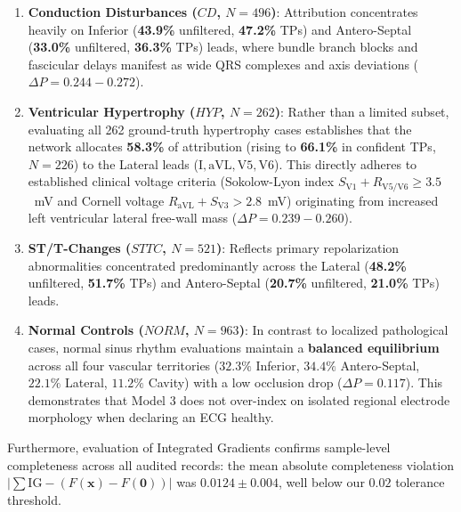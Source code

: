 \documentclass[5p,twocolumn,10pt]{elsarticle}
\begin{document}
\begin{enumerate}
    This confirms per-patient anatomical attribution concordance against verified clinical sub-diagnoses.
    \item \textbf{Conduction Disturbances ($CD$, $N=496$)}: Attribution concentrates heavily on Inferior (\textbf{43.9\%} unfiltered, \textbf{47.2\%} TPs) and Antero-Septal (\textbf{33.0\%} unfiltered, \textbf{36.3\%} TPs) leads, where bundle branch blocks and fascicular delays manifest as wide QRS complexes and axis deviations ($\Delta P = 0.244-0.272$).
    \item \textbf{Ventricular Hypertrophy ($HYP$, $N=262$)}: Rather than a limited subset, evaluating all 262 ground-truth hypertrophy cases establishes that the network allocates \textbf{58.3\%} of attribution (rising to \textbf{66.1\%} in confident TPs, $N=226$) to the Lateral leads ($\text{I}, \text{aVL}, \text{V5}, \text{V6}$). This directly adheres to established clinical voltage criteria (Sokolow-Lyon index $S_{\text{V1}} + R_{\text{V5/V6}} \ge 3.5$~mV and Cornell voltage $R_{\text{aVL}} + S_{\text{V3}} > 2.8$~mV) originating from increased left ventricular lateral free-wall mass ($\Delta P = 0.239-0.260$).
    \item \textbf{ST/T-Changes ($STTC$, $N=521$)}: Reflects primary repolarization abnormalities concentrated predominantly across the Lateral (\textbf{48.2\%} unfiltered, \textbf{51.7\%} TPs) and Antero-Septal (\textbf{20.7\%} unfiltered, \textbf{21.0\%} TPs) leads.
    \item \textbf{Normal Controls ($NORM$, $N=963$)}: In contrast to localized pathological cases, normal sinus rhythm evaluations maintain a \textbf{balanced equilibrium} across all four vascular territories ($32.3\%$ Inferior, $34.4\%$ Antero-Septal, $22.1\%$ Lateral, $11.2\%$ Cavity) with a low occlusion drop ($\Delta P = 0.117$). This demonstrates that Model 3 does not over-index on isolated regional electrode morphology when declaring an ECG healthy.
\end{enumerate}

Furthermore, evaluation of Integrated Gradients confirms sample-level completeness across all audited records: the mean absolute completeness violation $|\sum \text{IG} - (F(\mathbf{x}) - F(\mathbf{0}))|$ was $0.0124 \pm 0.004$, well below our $0.02$ tolerance threshold.
\end{document}
